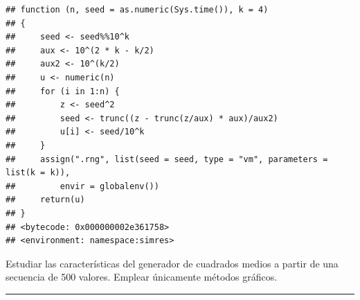 \documentclass[
]{book}
\theoremstyle{break}
\theoremstyle{nonumberplain}
\begin{document}
\begin{verbatim}
## function (n, seed = as.numeric(Sys.time()), k = 4) 
## {
##     seed <- seed%%10^k
##     aux <- 10^(2 * k - k/2)
##     aux2 <- 10^(k/2)
##     u <- numeric(n)
##     for (i in 1:n) {
##         z <- seed^2
##         seed <- trunc((z - trunc(z/aux) * aux)/aux2)
##         u[i] <- seed/10^k
##     }
##     assign(".rng", list(seed = seed, type = "vm", parameters = list(k = k)), 
##         envir = globalenv())
##     return(u)
## }
## <bytecode: 0x000000002e361758>
## <environment: namespace:simres>
\end{verbatim}

Estudiar las características del generador de cuadrados medios a partir de una secuencia de 500 valores.
Emplear únicamente métodos gráficos.

\begin{center}\rule{0.5\linewidth}{0.5pt}\end{center}

  
\end{document}
